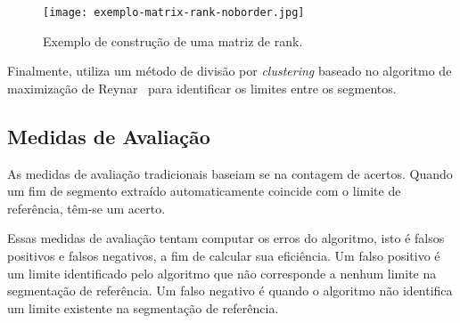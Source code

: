 





  \begin{figure}[!h]

	\centering
	\texttt{[image: exemplo-matrix-rank-noborder.jpg]}
	\caption{Exemplo de construção de uma matriz de rank.~\cite{Choi2000}}
	\label{fig:exemplomatrixrank}

  \end{figure}






	
Finalmente, utiliza um método de divisão por \textit{clustering} baseado no algoritmo de maximização de Reynar~\cite{Reynar1998} para identificar os limites entre os segmentos. %




\subsection{Medidas de Avaliação}


As medidas de avaliação tradicionais baseiam se na contagem de acertos. Quando um fim de segmento extraído automaticamente coincide com o limite de referência, têm-se um acerto.

Essas medidas de avaliação tentam computar os erros do algoritmo, isto é falsos positivos e falsos negativos, a fim de calcular sua eficiência. 
%
Um falso positivo é um limite identificado pelo algoritmo que não corresponde a nenhum limite na segmentação de referência. 
%
Um falso negativo é quando o algoritmo não identifica um limite existente na segmentação de referência.


